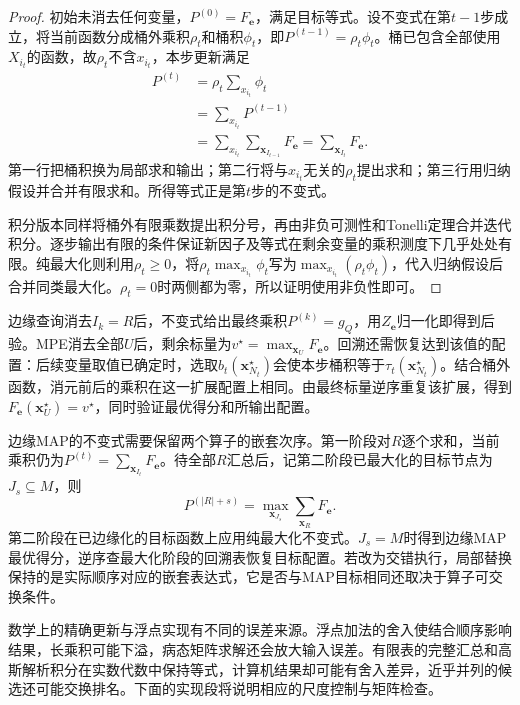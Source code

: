 \begin{proof}
  初始未消去任何变量，$P^{(0)}=F_{\bm{e}}$，满足目标等式。设不变式在第$t-1$步成立，将当前函数分成桶外乘积$\rho_t$和桶积$\phi_t$，即$P^{(t-1)}=\rho_t\phi_t$。桶已包含全部使用$X_{i_t}$的函数，故$\rho_t$不含$x_{i_t}$，本步更新满足
  \[
    \begin{aligned}
      P^{(t)}
      &=\rho_t\sum_{x_{i_t}}\phi_t\\
      &=\sum_{x_{i_t}}P^{(t-1)}\\
      &=\sum_{x_{i_t}}\sum_{\bm{x}_{I_{t-1}}}F_{\bm{e}}
       =\sum_{\bm{x}_{I_t}}F_{\bm{e}}.
    \end{aligned}
  \]
  第一行把桶积换为局部求和输出；第二行将与$x_{i_t}$无关的$\rho_t$提出求和；第三行用归纳假设并合并有限求和。所得等式正是第$t$步的不变式。

  积分版本同样将桶外有限乘数提出积分号，再由非负可测性和Tonelli定理合并迭代积分。逐步输出有限的条件保证新因子及等式在剩余变量的乘积测度下几乎处处有限。纯最大化则利用$\rho_t\geq0$，将$\rho_t\max_{x_{i_t}}\phi_t$写为$\max_{x_{i_t}}(\rho_t\phi_t)$，代入归纳假设后合并同类最大化。$\rho_t=0$时两侧都为零，所以证明使用非负性即可。
\end{proof}

边缘查询消去$I_k=R$后，不变式给出最终乘积$P^{(k)}=g_Q$，用$Z_{\bm{e}}$归一化即得到后验。MPE消去全部$U$后，剩余标量为$v^\star=\max_{\bm{x}_U}F_{\bm{e}}$。回溯还需恢复达到该值的配置：后续变量取值已确定时，选取$b_t(\bm{x}_{N_t}^\star)$会使本步桶积等于$\tau_t(\bm{x}_{N_t}^\star)$。结合桶外函数，消元前后的乘积在这一扩展配置上相同。由最终标量逆序重复该扩展，得到$F_{\bm{e}}(\bm{x}_U^\star)=v^\star$，同时验证最优得分和所输出配置。

边缘MAP的不变式需要保留两个算子的嵌套次序。第一阶段对$R$逐个求和，当前乘积仍为$P^{(t)}=\sum_{\bm{x}_{I_t}}F_{\bm{e}}$。待全部$R$汇总后，记第二阶段已最大化的目标节点为$J_s\subseteq M$，则
\begin{equation}
  P^{(|R|+s)}
  =\max_{\bm{x}_{J_s}}\sum_{\bm{x}_R}F_{\bm{e}}.
  \label{eq:pgm-elimination-map-invariant}
\end{equation}
第二阶段在已边缘化的目标函数上应用纯最大化不变式。$J_s=M$时得到边缘MAP最优得分，逆序查最大化阶段的回溯表恢复目标配置。若改为交错执行，局部替换保持的是实际顺序对应的嵌套表达式，它是否与MAP目标相同还取决于算子可交换条件。

数学上的精确更新与浮点实现有不同的误差来源。浮点加法的舍入使结合顺序影响结果，长乘积可能下溢，病态矩阵求解还会放大输入误差。有限表的完整汇总和高斯解析积分在实数代数中保持等式，计算机结果却可能有舍入差异，近乎并列的候选还可能交换排名。下面的实现段将说明相应的尺度控制与矩阵检查。

